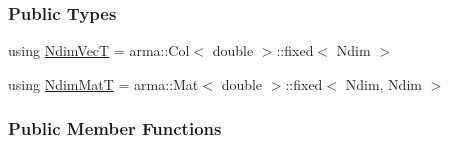 \subsubsection*{Public Types}
\begin{DoxyCompactItemize}
\item 
using \hyperlink{classprior__hessian_1_1AMHCopula_aee8626a3e27e52d8bfecc5201808660a}{Ndim\+VecT} = arma\+::\+Col$<$ double $>$\+::fixed$<$ Ndim $>$
\item 
using \hyperlink{classprior__hessian_1_1AMHCopula_a258252a11a49d2c73e19696b2e0e683d}{Ndim\+MatT} = arma\+::\+Mat$<$ double $>$\+::fixed$<$ Ndim, Ndim $>$
\end{DoxyCompactItemize}
\subsubsection*{Public Member Functions}
